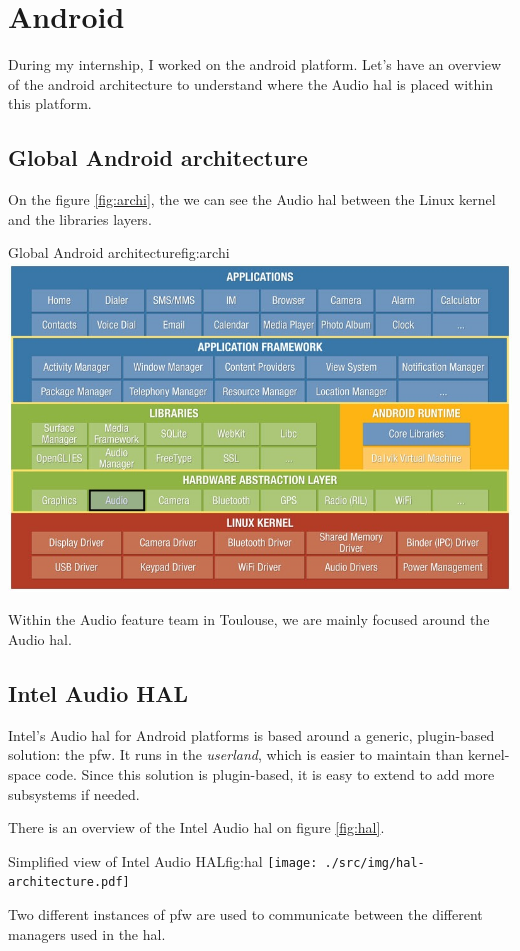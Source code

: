 \section{Android}
During my internship, I worked on the \gls{android} platform.
Let's have an overview of the \gls{android} architecture to understand where
the Audio \gls{hal} is placed within this platform.

\subsection{Global Android architecture}

On the figure \ref{fig:archi}, the we can see the Audio \gls{hal} between the
Linux \gls{kernel} and the libraries layers.
\begin{figureGraphics}{Global Android architecture}{fig:archi}
\includegraphics[width=\textwidth]{./src/img/android-archi-audio-hal.jpeg}
\end{figureGraphics}
Within the Audio feature team in Toulouse, we are mainly focused around the Audio \gls{hal}.

\subsection{Intel Audio HAL}
Intel's Audio \gls{hal} for Android platforms is based around a generic, plugin-based solution: the \gls{pfw}.
It runs in the \emph{userland}, which is easier to maintain than kernel-space code.
Since this solution is plugin-based, it is easy to extend to add more subsystems if needed.

There is an overview of the Intel Audio \gls{hal} on figure \ref{fig:hal}.
\begin{figureGraphics}{Simplified view of Intel Audio HAL}{fig:hal}
\texttt{[image: ./src/img/hal-architecture.pdf]}
\end{figureGraphics}
Two different instances of \gls{pfw} are used to communicate between the
different managers used in the \gls{hal}.

